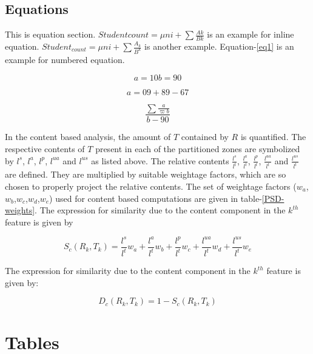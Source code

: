 \documentclass{IEEEtran}
\begin{document}
\subsection{Equations}

This is equation section. $ Studentcount = \mu{ni} + \sum\frac{Ak}{Bk}$ is an example for inline equation. $ Student_{count} = \mu{ni} + \sum\frac{A_k}{B^k}$ is another example. Equation-\ref{eq1} is an example for numbered equation.

\begin{equation}
	a=10
	b=90
\end{equation}


	\[
	a=09+89-67
\]


\begin{equation}
\frac{\sum\frac{a}{\varpi b}}{b-90}
\label{eq1}
\end{equation}




In the content based analysis, the amount of  $T$ contained by $R$ is quantified. The respective contents of $T$ present in each of the partitioned zones are symbolized by $l^s$, $l^a$, $l^p$, $l^{ua}$ and $l^{us}$ as listed above.  The relative contents $\frac{l^s}{l^t}$, $\frac{l^a}{l^t}$, $\frac{l^p}{l^t}$, $\frac{l^{ua}}{l^t}$ and $\frac{l^{us}}{l^t}$ are defined. They are multiplied by suitable weightage factors, which are so chosen to properly project the relative contents. The set of weightage factors ($w_a$,$w_b$,$w_c$,$w_d$,$w_e$) used for content based computations are given in table-\ref{PSD-weights}. The expression for similarity due to the content component in the $k^{th}$ feature is given by


\begin{equation}\label{SC}
		S_c(R_k, T_k) = \frac{l^s}{l^t}w_a + \frac{l^a}{l^t}w_b + \frac{l^p}{l^t}w_c + \frac{l^{ua}}{l^t}w_d + \frac{l^{us}}{l^t}w_e 
	\end{equation} 
	
	The expression for similarity due to the content component in the $k^{th}$ feature is given by:



\begin{equation}\label{DC}
		D_c(R_k, T_k) = 1 - S_c(R_k, T_k) 
	\end{equation}



\section{Tables}
\end{document}
